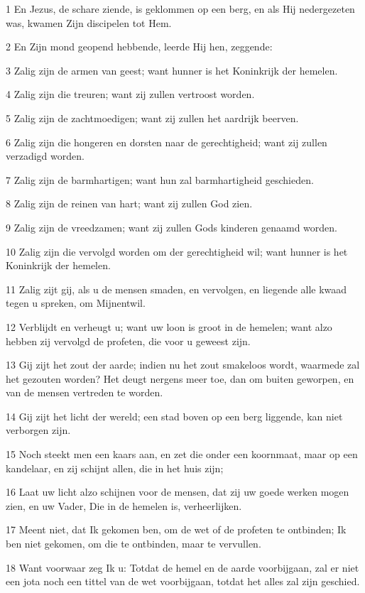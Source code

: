 \par 1 En Jezus, de schare ziende, is geklommen op een berg, en als Hij nedergezeten was, kwamen Zijn discipelen tot Hem.
\par 2 En Zijn mond geopend hebbende, leerde Hij hen, zeggende:
\par 3 Zalig zijn de armen van geest; want hunner is het Koninkrijk der hemelen.
\par 4 Zalig zijn die treuren; want zij zullen vertroost worden.
\par 5 Zalig zijn de zachtmoedigen; want zij zullen het aardrijk beerven.
\par 6 Zalig zijn die hongeren en dorsten naar de gerechtigheid; want zij zullen verzadigd worden.
\par 7 Zalig zijn de barmhartigen; want hun zal barmhartigheid geschieden.
\par 8 Zalig zijn de reinen van hart; want zij zullen God zien.
\par 9 Zalig zijn de vreedzamen; want zij zullen Gods kinderen genaamd worden.
\par 10 Zalig zijn die vervolgd worden om der gerechtigheid wil; want hunner is het Koninkrijk der hemelen.
\par 11 Zalig zijt gij, als u de mensen smaden, en vervolgen, en liegende alle kwaad tegen u spreken, om Mijnentwil.
\par 12 Verblijdt en verheugt u; want uw loon is groot in de hemelen; want alzo hebben zij vervolgd de profeten, die voor u geweest zijn.
\par 13 Gij zijt het zout der aarde; indien nu het zout smakeloos wordt, waarmede zal het gezouten worden? Het deugt nergens meer toe, dan om buiten geworpen, en van de mensen vertreden te worden.
\par 14 Gij zijt het licht der wereld; een stad boven op een berg liggende, kan niet verborgen zijn.
\par 15 Noch steekt men een kaars aan, en zet die onder een koornmaat, maar op een kandelaar, en zij schijnt allen, die in het huis zijn;
\par 16 Laat uw licht alzo schijnen voor de mensen, dat zij uw goede werken mogen zien, en uw Vader, Die in de hemelen is, verheerlijken.
\par 17 Meent niet, dat Ik gekomen ben, om de wet of de profeten te ontbinden; Ik ben niet gekomen, om die te ontbinden, maar te vervullen.
\par 18 Want voorwaar zeg Ik u: Totdat de hemel en de aarde voorbijgaan, zal er niet een jota noch een tittel van de wet voorbijgaan, totdat het alles zal zijn geschied.
